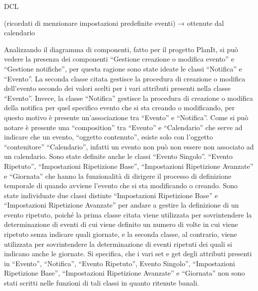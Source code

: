 \begin{listaPersonale}{DCL}
\begin{listaPersonale2}[DCL]{}

        (ricordati di menzionare impostazioni predefinite eventi) → ottenute dal calendario

        Analizzando il diagramma di componenti, fatto per il progetto PlanIt, si può vedere la presenza dei componenti “Gestione creazione o modifica evento” e “Gestione notifiche”, per questa ragione sono state ideate le classi “Notifica” e “Evento”. La seconda classe citata gestisce la procedura di creazione o modifica dell'evento secondo dei valori scelti per i vari attributi presenti nella classe “Evento”. Invece, la classe “Notifica” gestisce la procedura di creazione o modifica della notifica per quel specifico evento che si sta creando o modificando, per questo motivo è presente un'associazione tra “Evento” e “Notifica”.
        Come si può notare è presente una “composition” tra “Evento” e “Calendario” che serve ad indicare che un evento, “oggetto contenuto”, esiste solo con l'oggetto “contenitore” “Calendario”, infatti un evento non può non essere non associato ad un calendario.
        Sono state definite anche le classi “Evento Singolo”. “Evento Ripetuto”, “Impostazioni Ripetizione Base”, “Impostazioni Ripetizione Avanzate” e “Giornata” che hanno la funzionalità di dirigere il processo di definizione temporale di quando avviene l'evento che si sta modificando o creando. Sono state individuate due classi distinte “Impostazioni Ripetizione Base” e “Impostazioni Ripetizione Avanzate” per andare a gestire la definizione di un evento ripetuto, poiché la prima classe citata viene utilizzata per sovrintendere la determinazione di eventi di cui viene definito un numero di volte in cui viene ripetuto senza indicare quali giornate, e la seconda classe, al contrario, viene utilizzata per sovrintendere la determinazione di eventi ripetuti dei quali si indicano anche le giornate.
        Si specifica, che i vari set e get degli attributi presenti in “Evento”, “Notifica”, “Evento Ripetuto”, Evento Singolo”, “Impostazioni Ripetizione Base”, “Impostazioni Ripetizione Avanzate” e “Giornata” non sono stati scritti nelle funzioni di tali classi in quanto ritenute banali.




\end{listaPersonale2}
\end{listaPersonale}
